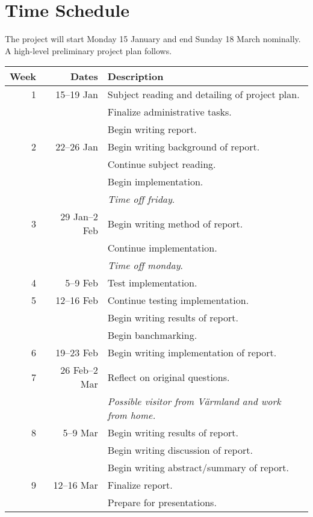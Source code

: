 \documentclass[a4paper, parskip]{scrartcl}
\begin{document}
\section{Time Schedule}
\label{sec:time_schedule}

The project will start Monday 15 January and end Sunday 18 March nominally. A
high-level preliminary project plan follows.

\begin{center}
  \begin{tabular}{rrl}
    \toprule
    \midrule
    \textbf{Week} & \textbf{Dates} & \textbf{Description} \\
    \midrule
    1 & 15--19 Jan & Subject reading and detailing of project plan. \\
    & & Finalize administrative tasks. \\
    & & Begin writing report. \\
    \midrule
    2 & 22--26 Jan & Begin writing background of report. \\
    & & Continue subject reading. \\
    & & Begin implementation. \\
    & & \emph{Time off friday}. \\
    \midrule
    3 & 29 Jan--2 Feb & Begin writing method of report. \\
    & & Continue implementation. \\
    & & \emph{Time off monday}. \\
    \midrule
    4 & 5--9 Feb & Test implementation. \\
    \midrule
    5 & 12--16 Feb & Continue testing implementation. \\
    & & Begin writing results of report. \\
    & & Begin banchmarking. \\
    \midrule
    6 & 19--23 Feb & Begin writing implementation of report. \\
    \midrule
    7 & 26 Feb--2 Mar & Reflect on original questions. \\
    & & \emph{Possible visitor from Värmland and work from home.} \\
    \midrule
    8 & 5--9 Mar & Begin writing results of report. \\
    & & Begin writing discussion of report. \\
    & & Begin writing abstract/summary of report. \\
    \midrule
    9 & 12--16 Mar & Finalize report. \\
    & & Prepare for presentations. \\
    \midrule
    \bottomrule
  \end{tabular}
\end{center}
\end{document}
